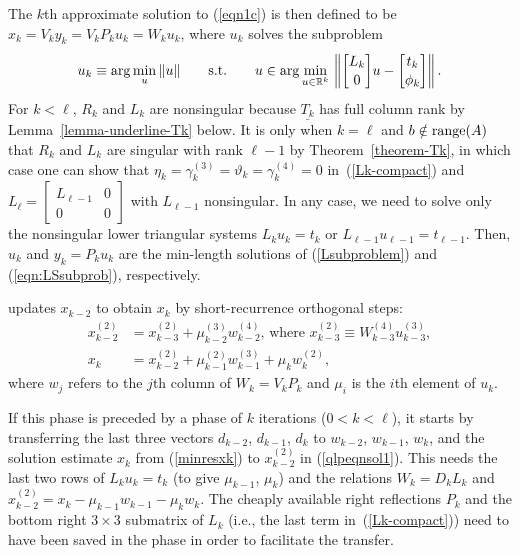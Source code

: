\documentclass{doc_acmtrans2m}
\begin{document}
The $k$th approximate solution to (\ref{eqn1c}) is then defined to be
$x_k = V_k y_k = V_k P_k u_k = W_k u_k$, where $u_k$ solves the
subproblem
\begin{equation}  \label{Lsubproblem}
  u_k\equiv \arg \min_u \norm{u} \quad\text{s.t.}\quad
        u \in \arg \min_{u \in \mathbb{R}^k}
          \, \left\|\bmat{L_k \\ 0} u - \bmat{t_k \\ \phi_k}\right\|.
\end{equation}
For $k<\ell$, $R_k$ and $L_k$ are nonsingular because
$\underline{T_k}$ has full column rank by
Lemma~\ref{lemma-underline-Tk} below.  It is only when $k=\ell$ and
$b\notin \range(A)$ that $R_k$ and $L_k$ are singular with rank
$\ell-1$ by Theorem~\ref{theorem-Tk}, in which case one can show that
$\eta_{k} = \gamma_{k}^{(3)} = \vartheta_{k} = \gamma_{k}^{(4)} = 0$
in~(\ref{Lk-compact}) and $L_\ell = \left[\begin{smallmatrix}
    L_{\ell-1} & 0 \\ 0 & 0 \end{smallmatrix}\right]$ with
$L_{\ell-1}$ nonsingular.  In any case, we need to solve only the
nonsingular lower triangular systems $L_k u_k = t_k$ or $L_{\ell-1}
u_{\ell-1} = t_{\ell-1}$. Then, $u_k$ and $y_k = P_k u_k$ are the
min-length solutions of (\ref{Lsubproblem}) and (\ref{eqn:LSsubprob}),
respectively.

\MINRESQLP updates $x_{k-2}$ to obtain $x_k$ by short-recurrence
orthogonal steps:
\begin{align}
   x_{k-2}^{(2)} &= x_{k-3}^{(2)} + \mu_{k-2}^{(3)} w_{k-2}^{(4)}
   \text{, where } x_{k-3}^{(2)} \equiv W_{k-3}^{(4)} u_{k-3}^{(3)},
   \label{qlpeqnsol1} \\ x_k &= x_{k-2}^{(2)} +
   \mu_{k-1}^{(2)} w_{k-1}^{(3)} + \mu_k w_k^{(2)},
   \label{qlpeqnsol2}
\end{align}
where $w_j$ refers to the $j$th column of $W_k = V_k P_k$ and $\mu_i$
is the $i$th element of $u_k$.

If this phase is preceded by a \MINRES phase of $k$ iterations ($0 < k
< \ell$), it starts by transferring the last three vectors $d_{k-2}$,
$d_{k-1}$, $d_k$ to $w_{k-2}$, $w_{k-1}$, $w_k$, and the solution
estimate $x_k$ from (\ref{minresxk}) to $x_{k-2}^{(2)}$ in
(\ref{qlpeqnsol1}).  This needs the last two rows of $L_k u_k = t_k$
(to give $\mu_{k-1}$, $\mu_k$) and the relations $W_k = D_k L_k$ and
$x_{k-2}^{(2)} = x_k - \mu_{k-1} w_{k-1} - \mu_k w_k$.
The cheaply available right reflections $P_k$ and the bottom right $3
\times 3$ submatrix of $L_k$ (i.e., the last term
in~(\ref{Lk-compact})) need to have been saved in the \MINRES phase in
order to facilitate the transfer.
\end{document}
